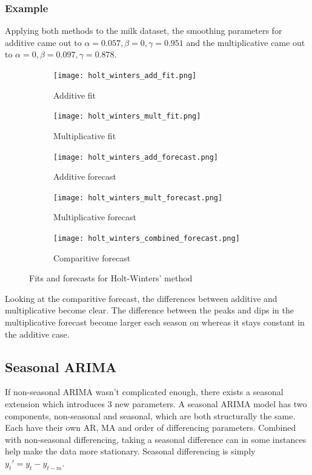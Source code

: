 \documentclass{article}
\begin{document}
  \subsubsection{Example}
  Applying both methods to the milk dataset, the smoothing parameters for additive came out to $\alpha=0.057,\beta=0,\gamma=0.951$ and the multiplicative came out to $\alpha=0,\beta=0.097,\gamma=0.878$.
  \begin{figure}[H]
    \centering
    \begin{subfigure}[b]{0.48\linewidth}
      \texttt{[image: holt\_winters\_add\_fit.png]}
       \caption{Additive fit }
    \end{subfigure}
    \begin{subfigure}[b]{0.48\linewidth}
      \texttt{[image: holt\_winters\_mult\_fit.png]}
      \caption{Multiplicative fit}
    \end{subfigure}
    \begin{subfigure}[b]{0.48\linewidth}
      \texttt{[image: holt\_winters\_add\_forecast.png]}
       \caption{Additive forecast}
    \end{subfigure}
    \begin{subfigure}[b]{0.48\linewidth}
      \texttt{[image: holt\_winters\_mult\_forecast.png]}
      \caption{Multiplicative forecast}
    \end{subfigure}
    \begin{subfigure}[b]{0.75\linewidth}
      \texttt{[image: holt\_winters\_combined\_forecast.png]}
      \caption{Comparitive forecast}
    \end{subfigure}
    \caption{Fits and forecasts for Holt-Winters' method}
  \end{figure}

  Looking at the comparitive forecast, the differences between additive and multiplicative become clear. The difference between the peaks and dips in the multiplicative forecast become larger each season on whereas it stays constant in the additive case.

  \subsection{Seasonal ARIMA}
  If non-seasonal ARIMA wasn't complicated enough, there exists a seasonal extension which introduces 3 new parameters. A seasonal ARIMA model has two components, non-seasonal and seasonal, which are both structurally the same. Each have their own AR, MA and order of differencing parameters. Combined with non-seasonal differencing, taking a seasonal difference can in some instances help make the data more stationary. Seasonal differencing is simply $y_t' = y_t - y_{t-m}$.
  
\end{document}
